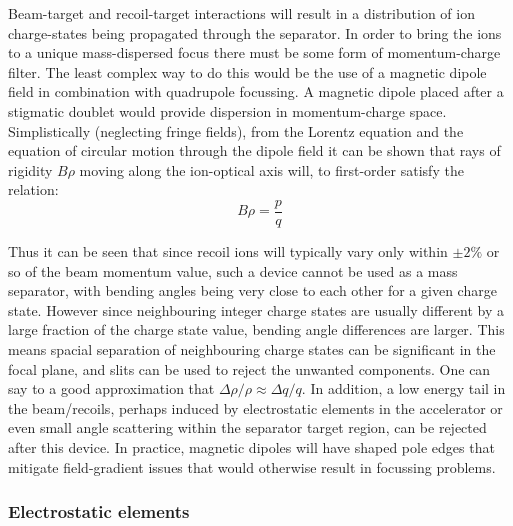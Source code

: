 Beam-target and recoil-target interactions will result in a distribution of ion charge-states being propagated through the separator. In order to bring the ions to a unique mass-dispersed focus there must be some form of momentum-charge filter. The least complex way to do this would be the use of a magnetic dipole field in combination with quadrupole focussing. A magnetic dipole placed after a stigmatic doublet would provide dispersion in momentum-charge space. Simplistically (neglecting fringe fields), from the Lorentz equation and the equation of circular motion through the dipole field it can be shown that rays of rigidity $B\rho$ moving along the ion-optical axis will, to first-order satisfy the relation:
\begin{equation}
B\rho=\frac{p}{q}
\end{equation}

Thus it can be seen that since recoil ions will typically vary only within $\pm2\%$ or so of the beam momentum value, such a device cannot be used as a mass separator, with bending angles being very close to each other for a given charge state. However since neighbouring integer charge states are usually different by a large fraction of the charge state value, bending angle differences are larger. This means spacial separation of neighbouring charge states can be significant in the focal plane, and slits can be used to reject the unwanted components. One can say to a good approximation that $\Delta \rho / \rho \approx \Delta q / q$. In addition, a low energy tail in the beam/recoils, perhaps induced by electrostatic elements in the accelerator or even small angle scattering within the separator target region, can be rejected after this device. In practice, magnetic dipoles will have shaped pole edges that mitigate field-gradient issues that would otherwise result in focussing problems.

\subsubsection{Electrostatic elements}


